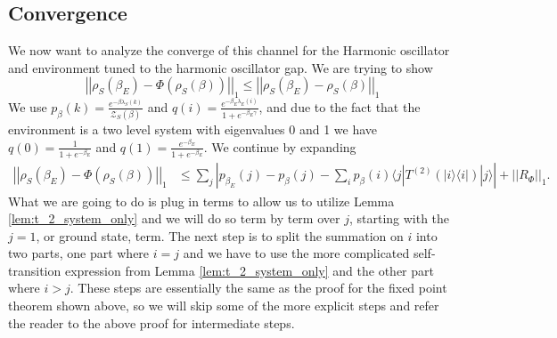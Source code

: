 \documentclass{article}
\newcommand{\ket}[1]{|#1\rangle}
\newcommand{\bra}[1]{\langle #1|}
\newcommand{\ketbra}[2]{| #1\rangle\! \langle #2|}
\newcommand{\norm}[1]{\left| \left| #1 \right| \right|}
\newcommand{\partfun}{\mathcal{Z}}
\begin{document}
\subsection{Convergence}
We now want to analyze the converge of this channel for the Harmonic oscillator and environment tuned to the harmonic oscillator gap. We are trying to show
\begin{equation}
    \norm{\rho_S(\beta_E) - \Phi(\rho_S(\beta))}_1 \leq \norm{\rho_S(\beta_E) - \rho_S(\beta)}_1
\end{equation}
We use $p_{\beta}(k) = \frac{e^{-\beta \lambda_S(k)}}{\partfun_S(\beta)}$ and $q(i) = \frac{e^{-\beta_E \lambda_E(i)}}{1 + e^{-\beta_E \gamma}}$, and due to the fact that the environment is a two level system with eigenvalues 0 and 1 we have $q(0) = \frac{1}{1 + e^{-\beta_E}}$ and $q(1) = \frac{e^{-\beta_E}}{1 + e^{-\beta_E}}$.
We continue by expanding
\begin{align}
    \norm{\rho_S(\beta_E) - \Phi(\rho_S(\beta))}_1 &\leq \sum_j \left| p_{\beta_E}(j) - p_{\beta}(j) - \sum_i p_{\beta}(i) \bra{j}T^{(2)}(\ketbra{i}{i})\ket{j} \right| + \norm{R_{\Phi}}_1.
\end{align}
What we are going to do is plug in terms to allow us to utilize Lemma \ref{lem:t_2_system_only} and we will do so term by term over $j$, starting with the $j=1$, or ground state, term. The next step is to split the summation on $i$ into two parts, one part where $i = j$ and we have to use the more complicated self-transition expression from Lemma \ref{lem:t_2_system_only} and the other part where $i > j$. These steps are essentially the same as the proof for the fixed point theorem shown above, so we will skip some of the more explicit steps and refer the reader to the above proof for intermediate steps.
\end{document}
